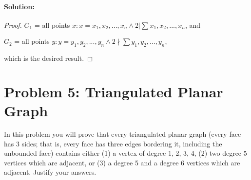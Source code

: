 \documentclass[11pt, notitlepage]{report}
\newcommand{\Question}[1]{\newpage\section{#1}}
\newenvironment{solution}{\paragraph{Solution:}}{\hfill}
\begin{document}
\begin{enumerate}[label=(\alph*)]
\begin{solution}
\begin{proof}
		\-\hspace{2cm}$G_1$ = all points $x : x= x_1,x_2,...,x_n \land 2|\sum{x_1,x_2,...,x_n}$, and 
		
		\-\hspace{2cm}$G_2$ = all points $y : y=y_1,y_2,...,y_n \land 2\nmid \sum{y_1,y_2,...,y_n}$, 
		
		which is the desired result.
	\end{proof}
\end{solution}
\end{enumerate}
\Question {Problem 5: Triangulated Planar Graph}
In this problem you will prove that every triangulated planar graph (every face has 3 sides; that is, every face has three edges bordering it, including the unbounded face)
contains either (1) a vertex of degree 1, 2, 3, 4, (2) two degree 5 vertices 
which are adjacent, or (3) a degree 5 and a degree 6 vertices which are 
adjacent. Justify your answers.
\end{document}
